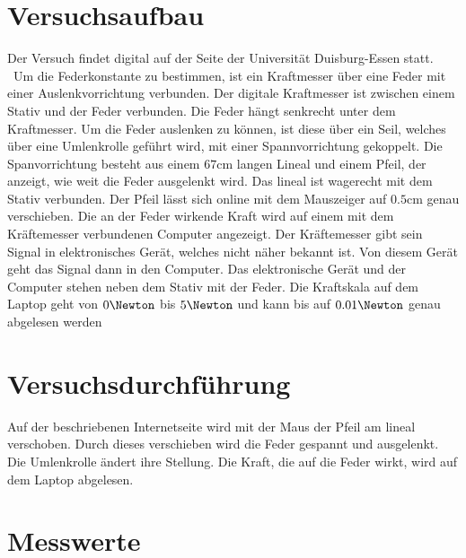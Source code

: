 


\section{Versuchsaufbau}
Der Versuch findet digital auf der Seite der Universität Duisburg-Essen 
\cite{Hook_Interaktiv} statt. \
Um die Federkonstante zu bestimmen, ist ein Kraftmesser über eine Feder mit einer Auslenkvorrichtung verbunden.
Der digitale Kraftmesser ist zwischen einem Stativ und der Feder verbunden. Die Feder hängt senkrecht unter dem Kraftmesser.
Um die Feder auslenken zu können, ist diese über ein Seil, welches über eine Umlenkrolle geführt wird, mit einer 
Spannvorrichtung gekoppelt. Die Spanvorrichtung besteht aus einem $67 \unit{\centi \meter}$ langen Lineal und einem Pfeil, 
der anzeigt, wie weit die Feder ausgelenkt wird. Das lineal ist wagerecht mit dem Stativ verbunden. Der Pfeil lässt sich online 
mit dem Mauszeiger auf $0.5 \unit{\centi \meter}$ genau verschieben. %
Die an der Feder wirkende Kraft wird auf einem mit dem Kräftemesser verbundenen Computer angezeigt. Der Kräftemesser 
gibt sein Signal in elektronisches Gerät, welches nicht näher bekannt ist. Von diesem Gerät geht das Signal dann in den 
Computer. Das elektronische Gerät und der Computer stehen neben dem Stativ mit der Feder. Die Kraftskala auf dem Laptop geht 
von $0 \unit{\Newton}$ bis $5 \unit{\Newton}$ und kann bis auf $0.01 \unit{\Newton}$ genau abgelesen werden


\section{Versuchsdurchführung}
\label{sec:Versuhsdurchfuehrung}
Auf der beschriebenen Internetseite wird mit der Maus der Pfeil am lineal verschoben. Durch dieses verschieben wird die Feder 
gespannt und ausgelenkt. Die Umlenkrolle ändert ihre Stellung. Die Kraft, die auf die Feder wirkt, wird auf dem Laptop 
abgelesen.

\section{Messwerte}





